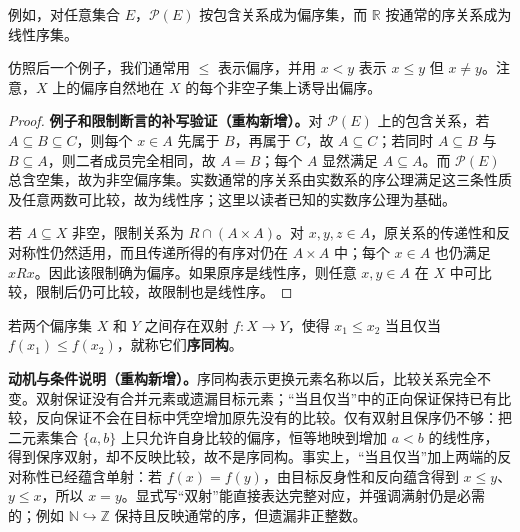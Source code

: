 \documentclass[../../main.tex]{subfiles}%
\begin{document}
\begin{examples}\label{examples:ch00-order-examples}
例如，对任意集合 $E$，$\mathscr{P}(E)$ 按包含关系成为偏序集，而 $\mathbb{R}$ 按通常的序关系成为线性序集。
\end{examples}
仿照后一个例子，我们通常用 $\leqslant$ 表示偏序，并用 $x<y$ 表示 $x\leqslant y$ 但 $x\neq y$。注意，$X$ 上的偏序自然地在 $X$ 的每个非空子集上诱导出偏序。
\begin{proof}
\textbf{例子和限制断言的补写验证（重构新增）。}对 $\mathscr{P}(E)$ 上的包含关系，若 $A\subseteq B\subseteq C$，则每个 $x\in A$ 先属于 $B$，再属于 $C$，故 $A\subseteq C$；若同时 $A\subseteq B$ 与 $B\subseteq A$，则二者成员完全相同，故 $A=B$；每个 $A$ 显然满足 $A\subseteq A$。而 $\mathscr{P}(E)$ 总含空集，故为非空偏序集。实数通常的序关系由实数系的序公理满足这三条性质及任意两数可比较，故为线性序；这里以读者已知的实数序公理为基础。

若 $A\subseteq X$ 非空，限制关系为 $R\cap(A\times A)$。对 $x,y,z\in A$，原关系的传递性和反对称性仍然适用，而且传递所得的有序对仍在 $A\times A$ 中；每个 $x\in A$ 也仍满足 $xRx$。因此该限制确为偏序。如果原序是线性序，则任意 $x,y\in A$ 在 $X$ 中可比较，限制后仍可比较，故限制也是线性序。
\end{proof}

\begin{definition}[序同构]\label{definition:ch00-order-isomorphism}
若两个偏序集 $X$ 和 $Y$ 之间存在双射 $f:X\to Y$，使得 $x_1\leqslant x_2$ 当且仅当 $f(x_1)\leqslant f(x_2)$，就称它们\textbf{序同构}。
\end{definition}
\begin{remark}
\textbf{动机与条件说明（重构新增）。}序同构表示更换元素名称以后，比较关系完全不变。双射保证没有合并元素或遗漏目标元素；“当且仅当”中的正向保证保持已有比较，反向保证不会在目标中凭空增加原先没有的比较。仅有双射且保序仍不够：把二元素集合 $\{a,b\}$ 上只允许自身比较的偏序，恒等地映到增加 $a<b$ 的线性序，得到保序双射，却不反映比较，故不是序同构。事实上，“当且仅当”加上两端的反对称性已经蕴含单射：若 $f(x)=f(y)$，由目标反身性和反向蕴含得到 $x\leqslant y$、$y\leqslant x$，所以 $x=y$。显式写“双射”能直接表达完整对应，并强调满射仍是必需的；例如 $\mathbb{N}\hookrightarrow\mathbb{Z}$ 保持且反映通常的序，但遗漏非正整数。
\end{remark}
\end{document}
